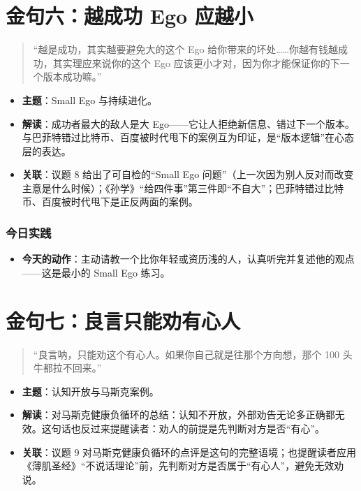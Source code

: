 \section{金句六：越成功 Ego
应越小}

\begin{quote}
``越是成功，其实越要避免大的这个 Ego
给你带来的坏处\ldots\ldots 你越有钱越成功，其实理应来说你的这个 Ego
应该更小才对，因为你才能保证你的下一个版本成功嘛。''
\end{quote}

\begin{itemize}
\tightlist
\item
  \textbf{主题}：Small Ego 与持续进化。
\item
  \textbf{解读}：成功者最大的敌人是大
  Ego------它让人拒绝新信息、错过下一个版本。与巴菲特错过比特币、百度被时代甩下的案例互为印证，是``版本逻辑''在心态层的表达。
\item
  \textbf{关联}：议题 8 给出了可自检的``Small Ego
  问题''（上一次因为别人反对而改变主意是什么时候）；《孙学》``给四件事''第三件即``不自大''；巴菲特错过比特币、百度被时代甩下是正反两面的案例。
\end{itemize}

\subsubsection{今日实践}

\begin{itemize}
\tightlist
\item
  \textbf{今天的动作}：主动请教一个比你年轻或资历浅的人，认真听完并复述他的观点------这是最小的
  Small Ego 练习。
\end{itemize}

\section{金句七：良言只能劝有心人}

\begin{quote}
``良言呐，只能劝这个有心人。如果你自己就是往那个方向想，那个 100
头牛都拉不回来。''
\end{quote}

\begin{itemize}
\tightlist
\item
  \textbf{主题}：认知开放与马斯克案例。
\item
  \textbf{解读}：对马斯克健康负循环的总结：认知不开放，外部劝告无论多正确都无效。这句话也反过来提醒读者：劝人的前提是先判断对方是否``有心''。
\item
  \textbf{关联}：议题 9
  对马斯克健康负循环的点评是这句的完整语境；也提醒读者应用《薄肌圣经》``不说话理论''前，先判断对方是否属于``有心人''，避免无效劝说。
\end{itemize}

